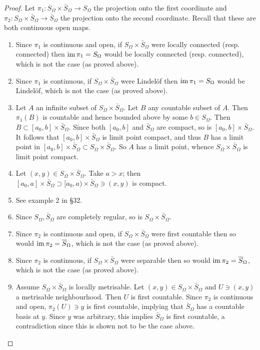 \begin{proof}
  Let $\pi_1 : S_\Omega \times \bar S_\Omega \to S_\Omega$ the projection onto the first coordinate and $\pi_2 : S_\Omega \times \bar S_\Omega \to \bar S_\Omega$ the projection onto the second coordinate. Recall that these are both continuous open maps.
  \begin{enumerate}[leftmargin=*]
  \item Since $\pi_1$ is continuous and open, if $S_\Omega \times \bar S_\Omega$ were locally connected (resp. connected) then $\operatorname{im} \pi_1 = S_\Omega$ would be locally connected (resp. connected), which is not the case (as proved above).
  \item Since $\pi_1$ is continuous, if $S_\Omega \times \bar S_\Omega$ were Lindel\"of then $\operatorname{im} \pi_1 = S_\Omega$ would be Lindel\"of, which is not the case (as proved above).
  \item Let $A$ an infinite subset of $S_\Omega \times \bar S_\Omega$. Let $B$ any countable subset of $A$. Then $\pi_1(B)$ is countable and hence bounded above by some $b \in S_\Omega$. Then $B \subset [a_0,b] \times \bar S_\Omega$. Since both $[a_0,b]$ and $\bar S_\Omega$ are compact, so is $[a_0,b] \times \bar S_\Omega$. It follows that $[a_0,b] \times \bar S_\Omega$ is limit point compact, and thus $B$ has a limit point in $[a_0,b] \times \bar S_\Omega \subset S_\Omega \times \bar S_\Omega$. So $A$ has a limit point, whence $S_\Omega \times \bar S_\Omega$ is limit point compact.
  \item Let $(x,y) \in S_\Omega \times \bar S_\Omega$. Take $a > x$; then $[a_0,a] \times \bar S_\Omega \supset [a_0,a) \times \bar S_\Omega \ni (x,y)$ is compact.
  \item See example 2 in \S 32.
  \item Since $S_\Omega, \bar S_\Omega$ are completely regular, so is $S_\Omega \times \bar S_\Omega$.
  \item Since $\pi_2$ is continuous and open, if $S_\Omega \times \bar S_\Omega$ were first countable then so would $\operatorname{im} \pi_2 = \overline{S}_\Omega$, which is not the case (as proved above).
  \item Since $\pi_2$ is continuous, if $S_\Omega \times \bar S_\Omega$ were separable then so would $\operatorname{im} \pi_2 = \overline{S}_\Omega$, which is not the case (as proved above).
  \item Assume $S_\Omega \times \bar S_\Omega$ is locally metrisable. Let $(x,y) \in S_\Omega \times \bar S_\Omega$ and $U \ni (x,y)$ a metrisable neighbourhood. Then $U$ is first countable. Since $\pi_2$ is continuous and open, $\pi_2(U) \ni y$ is first countable, implying that $\bar S_\Omega$ has a countable basis at $y$. Since $y$ was arbitrary, this implies $\bar S_\Omega$ is first countable, a contradiction since this is shown not to be the case above.  \qedhere
  \end{enumerate}
\end{proof}

